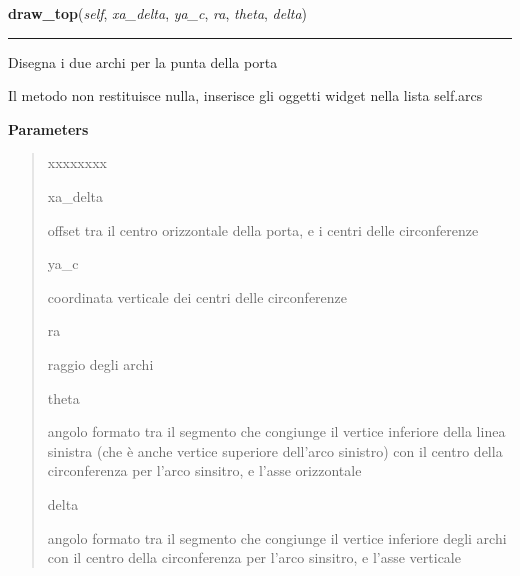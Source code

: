 \hspace{.8\funcindent}\begin{boxedminipage}{\funcwidth}

    \raggedright \textbf{draw\_top}(\textit{self}, \textit{xa\_delta}, \textit{ya\_c}, \textit{ra}, \textit{theta}, \textit{delta})

    \vspace{-1.5ex}

    \rule{\textwidth}{0.5\fboxrule}
\setlength{\parskip}{2ex}
    Disegna i due archi per la punta della porta

    Il metodo non restituisce nulla, inserisce gli oggetti widget nella 
    lista self.arcs

\setlength{\parskip}{1ex}
      \textbf{Parameters}
      \vspace{-1ex}

      \begin{quote}
        \begin{Ventry}{xxxxxxxx}

          \item[xa\_delta]

          offset tra il centro orizzontale della porta, e i centri delle 
          circonferenze

          \item[ya\_c]

          coordinata verticale dei centri delle circonferenze

          \item[ra]

          raggio degli archi

          \item[theta]

          angolo formato tra il segmento che congiunge il vertice inferiore
          della linea sinistra (che è anche vertice superiore dell'arco 
          sinistro) con il centro della circonferenza per l'arco sinsitro, 
          e l'asse orizzontale

          \item[delta]

          angolo formato tra il segmento che congiunge il vertice inferiore
          degli archi con il centro della circonferenza per l'arco 
          sinsitro, e l'asse verticale

        \end{Ventry}

      \end{quote}

    \end{boxedminipage}

